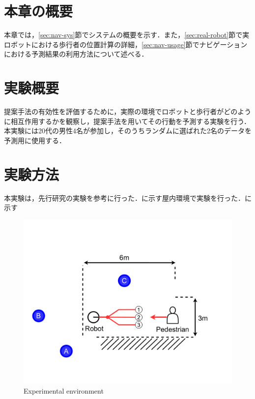 

\section{本章の概要}
本章では，\ref{sec:nav-sys}節でシステムの概要を示す．また，\ref{sec:real-robot}節で実ロボットにおける歩行者の位置計算の詳細，\ref{sec:nav-usage}節でナビゲーションにおける予測結果の利用方法について述べる．

\section{実験概要}
提案手法の有効性を評価するために，実際の環境でロボットと歩行者がどのように相互作用するかを観察し，提案手法を用いてその行動を予測する実験を行う．本実験には20代の男性4名が参加し，そのうちランダムに選ばれた2名のデータを予測用に使用する．

\section{実験方法}
本実験は，先行研究\cite{si2023-tanno}の実験を参考に行った．に示す屋内環境で実験を行った．に示す

\begin{figure}[H]
  \centering
 \includegraphics[keepaspectratio, scale=0.3]
      {images/oculus_experiments.pdf}
\caption{Experimental environment}
 \label{Fig:oculus-exp-overview}
\end{figure} 

